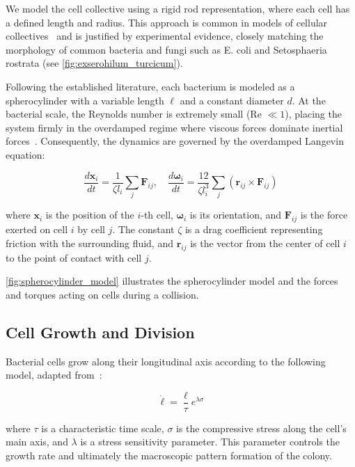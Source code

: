 \documentclass[conference]{IEEEtran}
\begin{document}
We model the cell collective using a rigid rod representation, where each cell has a defined length and radius. This approach is common in models of cellular collectives~\cite{You2018, Weady2024,Weady2024SM, Blanchard2015, Warren2019, Ghosh2015} and is justified by experimental evidence, closely matching the morphology of common bacteria and fungi such as E. coli and Setosphaeria rostrata (see \autoref{fig:exserohilum_turcicum}).

Following the established literature, each bacterium is modeled as a spherocylinder with a variable length $\ell$ and a constant diameter $d$. At the bacterial scale, the Reynolds number is extremely small (Re $\ll 1$), placing the system firmly in the overdamped regime where viscous forces dominate inertial forces~\cite{datta2024lifelowreynoldsnumber,Rudge2012 }. Consequently, the dynamics are governed by the overdamped Langevin equation:

\begin{equation} \label{eq:overdamped_langevin}
    \frac{d \mathbf{x}_i}{dt} = \frac{1}{\zeta l_i} \sum_j \mathbf{F}_{ij}, \quad \frac{d \boldsymbol{\omega}_i}{dt} = \frac{12}{\zeta l_i^3} \sum_j (\mathbf{r}_{ij} \times \mathbf{F}_{ij})
\end{equation}

where $\mathbf{x}_i$ is the position of the $i$-th cell, $\boldsymbol{\omega}_i$ is its orientation, and $\mathbf{F}_{ij}$ is the force exerted on cell $i$ by cell $j$. The constant $\zeta$ is a drag coefficient representing friction with the surrounding fluid, and $\mathbf{r}_{ij}$ is the vector from the center of cell $i$ to the point of contact with cell $j$.

\autoref{fig:spherocylinder_model} illustrates the spherocylinder model and the forces and torques acting on cells during a collision.


\subsection{Cell Growth and Division}

Bacterial cells grow along their longitudinal axis according to the following model, adapted from~\cite{Weady2024SM}:

\begin{equation} \label{eq:growth}
    \dot{{\ell}} = \frac{{\ell}}{\tau} e^{\lambda \sigma}
\end{equation}

where $\tau$ is a characteristic time scale, $\sigma$ is the compressive stress along the cell's main axis, and $\lambda$ is a stress sensitivity parameter. This parameter controls the growth rate and ultimately the macroscopic pattern formation of the colony.
\end{document}
